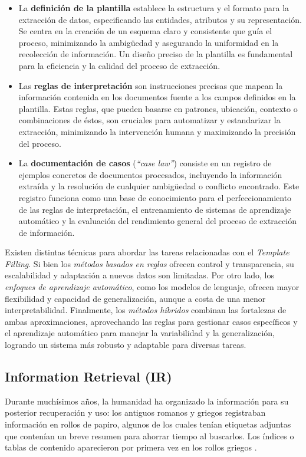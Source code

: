 \begin{itemize}
    \item La \textbf{definición de la plantilla} establece la estructura y el formato 
    para la extracción de datos, especificando las entidades, atributos y su representación. 
    Se centra en la creación de un esquema claro y consistente que guía el proceso, 
    minimizando la ambigüedad y asegurando la uniformidad en la recolección de información. 
    Un diseño preciso de la plantilla es fundamental para la eficiencia y la calidad del proceso de extracción.
    \item Las \textbf{reglas de interpretación} son instrucciones precisas que mapean 
    la información contenida en los documentos fuente a los campos definidos en la plantilla. 
    Estas reglas, que pueden basarse en patrones, ubicación, contexto o combinaciones de éstos, 
    son cruciales para automatizar y estandarizar la extracción, minimizando la intervención humana y 
    maximizando la precisión del proceso.
    \item La \textbf{documentación de casos} (\textit{``case law''}) consiste en un registro de 
    ejemplos concretos de documentos procesados, incluyendo la información extraída y 
    la resolución de cualquier ambigüedad o conflicto encontrado. Este registro funciona 
    como una base de conocimiento para el perfeccionamiento de las reglas de interpretación, 
    el entrenamiento de sistemas de aprendizaje automático y la evaluación del rendimiento 
    general del proceso de extracción de información.
\end{itemize}

Existen distintas técnicas para abordar las tareas relacionadas con el \textit{Template Filling}. 
Si bien los \textit{métodos basados en reglas} ofrecen control y transparencia, 
su escalabilidad y adaptación a nuevos datos son limitadas. Por otro lado, 
los \textit{enfoques de aprendizaje automático}, como los modelos de lenguaje, 
ofrecen mayor flexibilidad y capacidad de generalización, aunque a costa de una 
menor interpretabilidad. Finalmente, los \textit{métodos híbridos} combinan 
las fortalezas de ambas aproximaciones, aprovechando las reglas para gestionar 
casos específicos y el aprendizaje automático para manejar la variabilidad y 
la generalización, logrando un sistema más robusto y adaptable para diversas tareas.


\subsection{Information Retrieval (IR)}
Durante muchísimos años, la humanidad ha organizado la información para su posterior 
recuperación y uso: los antiguos romanos y griegos registraban información en 
rollos de papiro, algunos de los cuales tenían etiquetas adjuntas que contenían un 
breve resumen para ahorrar tiempo al buscarlos. Los índices o tablas de contenido 
aparecieron por primera vez en los rollos griegos \cite{Wikipedia0}.

